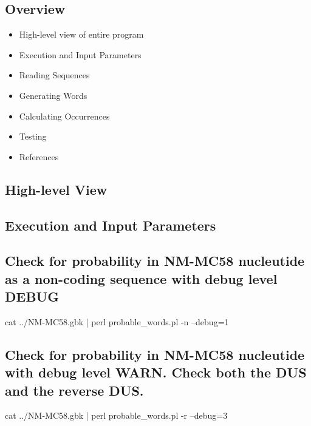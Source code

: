 \documentclass[12pt,notitlepage]{article}
\author{Leo Przybylski}
\begin{document}
  \W \begin{s5presentation}
  \maketitle

\begin{ifhtml}
    \begin{s5slide}
      \section{Overview}
      \begin{itemize}
      \item High-level view of entire program
      \item Execution and Input Parameters
      \item Reading Sequences
      \item Generating Words
      \item Calculating Occurrences
      \item Testing
      \item References
      \end{itemize}
    \end{s5slide}

    \begin{s5slide}
      \section{High-level View}
    \end{s5slide}

    \begin{s5slide}
      \section{Execution and Input Parameters}
      \subsection{Check for probability in NM-MC58 nucleutide as a non-coding sequence with debug level DEBUG}
      cat ../NM-MC58.gbk | perl probable_words.pl -n --debug=1
      \subsection{Check for probability in NM-MC58 nucleutide with debug level WARN. Check both the DUS and the reverse DUS.}
      cat ../NM-MC58.gbk | perl probable_words.pl -r --debug=3

\end{s5slide}
\end{ifhtml}
\end{s5presentation}
\end{document}
